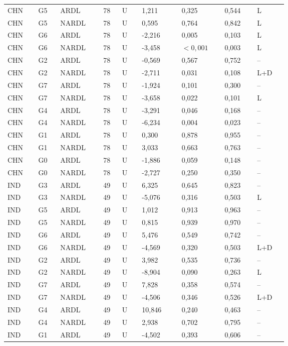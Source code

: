 {\begin{longtable}{p{0.075\linewidth}p{0.05\linewidth}p{0.09\linewidth}p{0.04\linewidth}p{0.05\linewidth}p{0.1\linewidth}p{0.085\linewidth}p{0.085\linewidth}p{0.075\linewidth}}
CHN & G5 & ARDL & 78 & U & 1,211 & 0,325 & 0,544 & L\\
CHN & G5 & NARDL & 78 & U & 0,595 & 0,764 & 0,842 & L\\
CHN & G6 & ARDL & 78 & U & -2,216 & 0,005 & 0,103 & L\\
CHN & G6 & NARDL & 78 & U & -3,458 & \(<0{,}001\) & 0,003 & L\\
CHN & G2 & ARDL & 78 & U & -0,569 & 0,567 & 0,752 & --\\
CHN & G2 & NARDL & 78 & U & -2,711 & 0,031 & 0,108 & L+D\\
CHN & G7 & ARDL & 78 & U & -1,924 & 0,101 & 0,300 & --\\
CHN & G7 & NARDL & 78 & U & -3,658 & 0,022 & 0,101 & L\\
CHN & G4 & ARDL & 78 & U & -3,291 & 0,046 & 0,168 & --\\
CHN & G4 & NARDL & 78 & U & -6,234 & 0,004 & 0,023 & --\\
CHN & G1 & ARDL & 78 & U & 0,300 & 0,878 & 0,955 & --\\
CHN & G1 & NARDL & 78 & U & 3,033 & 0,663 & 0,763 & --\\
CHN & G0 & ARDL & 78 & U & -1,886 & 0,059 & 0,148 & --\\
CHN & G0 & NARDL & 78 & U & -2,727 & 0,250 & 0,350 & --\\
IND & G3 & ARDL & 49 & U & 6,325 & 0,645 & 0,823 & --\\
IND & G3 & NARDL & 49 & U & -5,076 & 0,316 & 0,503 & L\\
IND & G5 & ARDL & 49 & U & 1,012 & 0,913 & 0,963 & --\\
IND & G5 & NARDL & 49 & U & 0,815 & 0,939 & 0,970 & --\\
IND & G6 & ARDL & 49 & U & 5,476 & 0,549 & 0,742 & --\\
IND & G6 & NARDL & 49 & U & -4,569 & 0,320 & 0,503 & L+D\\
IND & G2 & ARDL & 49 & U & 3,982 & 0,535 & 0,736 & --\\
IND & G2 & NARDL & 49 & U & -8,904 & 0,090 & 0,263 & L\\
IND & G7 & ARDL & 49 & U & 7,828 & 0,358 & 0,574 & --\\
IND & G7 & NARDL & 49 & U & -4,506 & 0,346 & 0,526 & L+D\\
IND & G4 & ARDL & 49 & U & 10,846 & 0,240 & 0,463 & --\\
IND & G4 & NARDL & 49 & U & 2,938 & 0,702 & 0,795 & --\\
IND & G1 & ARDL & 49 & U & -4,502 & 0,393 & 0,606 & --\\

\end{longtable}}
